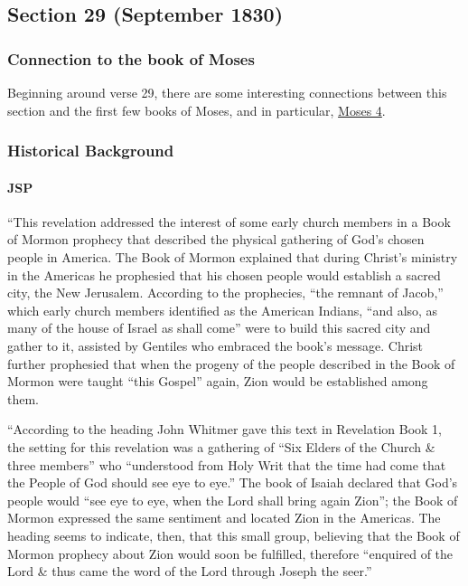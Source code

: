 \subsection{Section 29 (September 1830)}
	\label{DC29}
	
	\subsubsection{Connection to the book of Moses}
	
		Beginning around verse 29, there are some interesting connections between this section and the first few books of Moses, and in particular, \hyperref[MOSES-4]{Moses 4}.
	
	\subsubsection{Historical Background}
		\label{DC29-HB}
		
		\paragraph{JSP}
		
			``This revelation addressed the interest of some early church members in a Book of Mormon prophecy that described the physical gathering of God's chosen people in America. The Book of Mormon explained that during Christ's ministry in the Americas he prophesied that his chosen people would establish a sacred city, the New Jerusalem. According to the prophecies, ``the remnant of Jacob,'' which early church members identified as the American Indians, ``and also, as many of the house of Israel as shall come'' were to build this sacred city and gather to it, assisted by Gentiles who embraced the book's message. Christ further prophesied that when the progeny of the people described in the Book of Mormon were taught ``this Gospel'' again, Zion would be established among them.
			
			``According to the heading John Whitmer gave this text in Revelation Book 1, the setting for this revelation was a gathering of ``Six Elders of the Church \& three members'' who ``understood from Holy Writ that the time had come that the People of God should see eye to eye.'' The book of Isaiah declared that God's people would ``see eye to eye, when the Lord shall bring again Zion''; the Book of Mormon expressed the same sentiment and located Zion in the Americas. The heading seems to indicate, then, that this small group, believing that the Book of Mormon prophecy about Zion would soon be fulfilled, therefore ``enquired of the Lord \& thus came the word of the Lord through Joseph the seer.''
			
